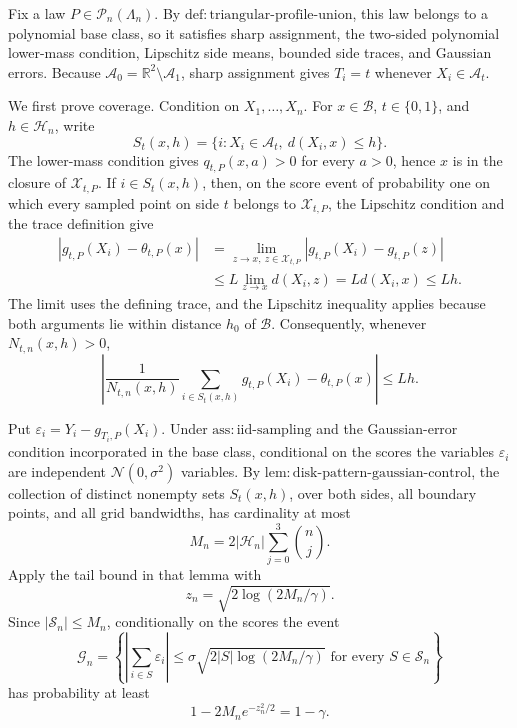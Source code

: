 Fix a law \(P\in\mathcal P_n(\Lambda_n)\).  By \(\mathrm{def:triangular\text{-}profile\text{-}union}\), this law belongs to a polynomial base class, so it satisfies sharp assignment, the two-sided polynomial lower-mass condition, Lipschitz side means, bounded side traces, and Gaussian errors.  Because \(\mathcal A_0=\mathbb R^2\setminus\mathcal A_1\), sharp assignment gives \(T_i=t\) whenever \(X_i\in\mathcal A_t\).

We first prove coverage.  Condition on \(X_1,\ldots,X_n\).  For \(x\in\mathcal B\), \(t\in\{0,1\}\), and \(h\in\mathcal H_n\), write
\[
 S_t(x,h)=\{i:X_i\in\mathcal A_t,\ d(X_i,x)\le h\}.
\]
The lower-mass condition gives \(q_{t,P}(x,a)>0\) for every \(a>0\), hence \(x\) is in the closure of \(\mathcal X_{t,P}\).  If \(i\in S_t(x,h)\), then, on the score event of probability one on which every sampled point on side \(t\) belongs to \(\mathcal X_{t,P}\), the Lipschitz condition and the trace definition give
\[
 \begin{aligned}
 |g_{t,P}(X_i)-\theta_{t,P}(x)|
 &=\lim_{z\to x,\ z\in\mathcal X_{t,P}}
   |g_{t,P}(X_i)-g_{t,P}(z)|\\
 &\le L\lim_{z\to x}d(X_i,z)
 =Ld(X_i,x)
 \le Lh .
 \end{aligned} \tag{43}
\]
The limit uses the defining trace, and the Lipschitz inequality applies because both arguments lie within distance \(h_0\) of \(\mathcal B\).  Consequently, whenever \(N_{t,n}(x,h)>0\),
\[
 \left|
 \frac{1}{N_{t,n}(x,h)}\sum_{i\in S_t(x,h)}g_{t,P}(X_i)
 -\theta_{t,P}(x)
 \right|\le Lh . \tag{44}
\]

Put \(\varepsilon_i=Y_i-g_{T_i,P}(X_i)\).  Under \(\mathrm{ass:iid\text{-}sampling}\) and the Gaussian-error condition incorporated in the base class, conditional on the scores the variables \(\varepsilon_i\) are independent \(\mathcal N(0,\sigma^2)\) variables.  By \(\mathrm{lem:disk\text{-}pattern\text{-}gaussian\text{-}control}\), the collection of distinct nonempty sets \(S_t(x,h)\), over both sides, all boundary points, and all grid bandwidths, has cardinality at most
\[
 M_n=2|\mathcal H_n|\sum_{j=0}^3\binom nj.
\]
Apply the tail bound in that lemma with
\[
 z_n=\sqrt{2\log(2M_n/\gamma)}.
\]
Since \(|\mathscr S_n|\le M_n\), conditionally on the scores the event
\[
 \mathcal G_n=
 \left\{
 \left|\sum_{i\in S}\varepsilon_i\right|
 \le \sigma\sqrt{2|S|\log(2M_n/\gamma)}
 \text{ for every }S\in\mathscr S_n
 \right\} \tag{45}
\]
has probability at least
\[
 1-2M_n e^{-z_n^2/2}=1-\gamma. \tag{46}
\]

